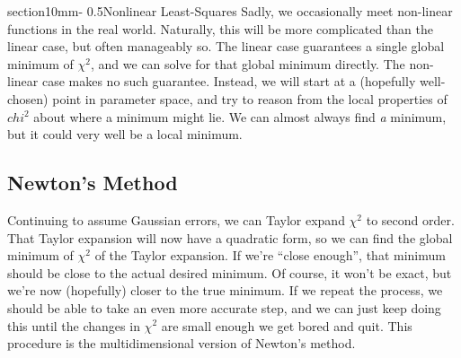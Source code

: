 \documentclass[letterpaper,11pt,preprint]{aastex}
\makeatletter
\renewcommand{\section}{\@startsection%
{section}{1}{0mm}{-\baselineskip}%
{0.5\baselineskip}{\normalfont\Large\bfseries}}%
\makeatother
\begin{document}
{\section{Nonlinear Least-Squares}
Sadly, we occasionally meet non-linear functions in the real world.
Naturally, this will be more complicated than the linear case, but
often manageably so.  The linear case guarantees a single global
minimum of $\chi^2$, and we can solve for that global minimum
directly.  The non-linear case makes no such guarantee.  Instead, we
will start at a (hopefully well-chosen) point in parameter space, and
try to reason from the local properties of $chi^2$ about where a
minimum might lie.  We can almost always find \textit{a} minimum, but
it could very well be a local minimum.   

\subsection{Newton's Method}

Continuing to assume Gaussian errors, we can Taylor expand $\chi^2$ to
second order.  That Taylor expansion will now have a quadratic form,
so we can find the global minimum of $\chi^2$ of the Taylor
expansion.  If we're ``close enough'', that minimum should be close to
the actual desired minimum.  Of course, it won't be exact, but we're
now (hopefully) closer to the true minimum.  If we repeat the
process, we should be able to take an even more accurate step, and we
can just keep doing this until the changes in $\chi^2$ are small
enough we get bored and quit.  This procedure is the multidimensional
version of Newton's method.  

}
\end{document}
